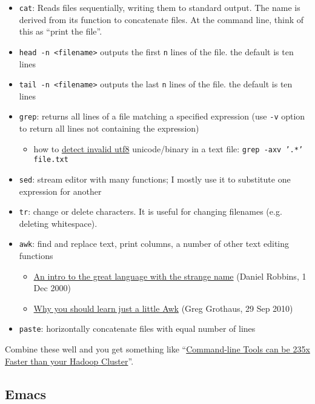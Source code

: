 \begin{itemize}
	\item \texttt{cat}: Reads files sequentially, writing them to standard output. The name is derived from its function to concatenate files. At the command line, think of this as ``print the file''.
	\item \texttt{head -n <filename>} outputs the first \texttt{n} lines of the file. the default is ten lines
	\item \texttt{tail -n <filename>} outputs the last \texttt{n} lines of the file. the default is ten lines
	\item \texttt{grep}: returns all lines of a file matching a specified expression (use \texttt{-v} option to return all lines not containing the expression)
	\begin{itemize}
		\item how to \href{https://stackoverflow.com/questions/29465612/how-to-detect-invalid-utf8-unicode-binary-in-a-text-file}{detect invalid utf8} unicode/binary in a text file: \texttt{grep -axv '.*' file.txt}
	\end{itemize}
	\item \texttt{sed}: stream editor with many functions; I mostly use it to substitute one expression for another
	\item \texttt{tr}: change or delete characters. It is useful for changing filenames (e.g. deleting whitespace).
	\item \texttt{awk}: find and replace text, print columns, a number of other text editing functions
	\begin{itemize}
		\item \href{https://developer.ibm.com/tutorials/l-awk1/}{An intro to the great language with the strange name} (Daniel Robbins, 1 Dec 2000)
		\item \href{https://gregable.com/2010/09/why-you-should-know-just-little-awk.html}{Why you should learn just a little Awk} (Greg Grothaus, 29 Sep 2010)
	\end{itemize}
	\item \texttt{paste}: horizontally concatenate files with equal number of lines
\end{itemize}

Combine these well and you get something like
``\href{https://adamdrake.com/command-line-tools-can-be-235x-faster-than-your-hadoop-cluster.html}{Command-line Tools can be 235x Faster than your Hadoop Cluster}''.

\subsection{Emacs}

